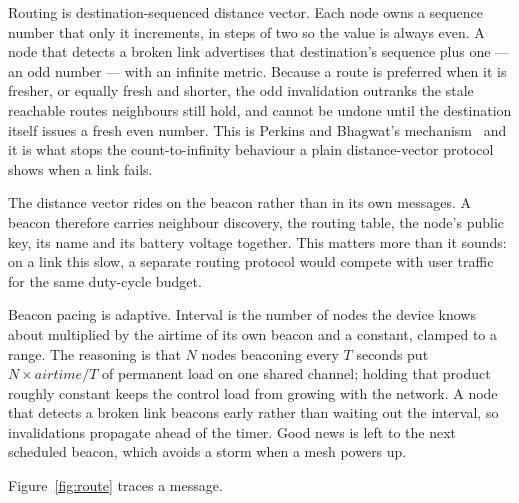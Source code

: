 \documentclass[conference]{IEEEtran}
\begin{document}
Routing is destination-sequenced distance vector. Each node owns a sequence
number that only it increments, in steps of two so the value is always even. A
node that detects a broken link advertises that destination's sequence plus one —
an odd number — with an infinite metric. Because a route is preferred when it is
fresher, or equally fresh and shorter, the odd invalidation outranks the stale
reachable routes neighbours still hold, and cannot be undone until the
destination itself issues a fresh even number. This is Perkins and Bhagwat's
mechanism~\cite{perkins1994dsdv} and it is what stops the count-to-infinity
behaviour a plain distance-vector protocol shows when a link fails.

The distance vector rides on the beacon rather than in its own messages. A beacon
therefore carries neighbour discovery, the routing table, the node's public key,
its name and its battery voltage together. This matters more than it sounds: on a
link this slow, a separate routing protocol would compete with user traffic for
the same duty-cycle budget.

Beacon pacing is adaptive. Interval is the number of nodes the device knows about
multiplied by the airtime of its own beacon and a constant, clamped to a range.
The reasoning is that $N$ nodes beaconing every $T$ seconds put $N \times
\mathit{airtime} / T$ of permanent load on one shared channel; holding that
product roughly constant keeps the control load from growing with the network.
A node that detects a broken link beacons early rather than waiting out the
interval, so invalidations propagate ahead of the timer. Good news is left to the
next scheduled beacon, which avoids a storm when a mesh powers up.

Figure~\ref{fig:route} traces a message.
\end{document}

